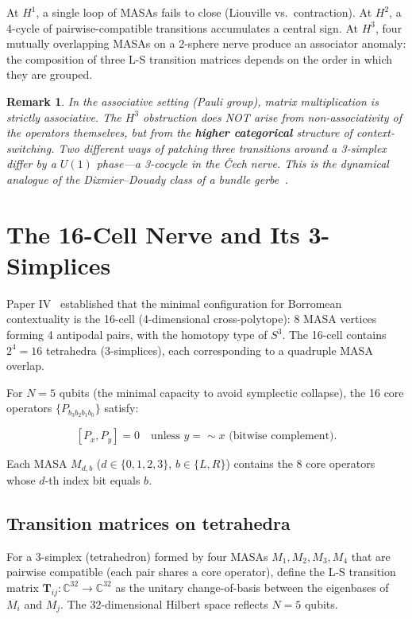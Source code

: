 \documentclass[11pt]{article}
\newtheorem{remark}[theorem]{Remark}
\begin{document}
At $H^1$, a single loop of MASAs fails to close (Liouville vs.\ contraction).
At $H^2$, a 4-cycle of pairwise-compatible transitions accumulates a central
sign. At $H^3$, four mutually overlapping MASAs on a $2$-sphere nerve produce
an associator anomaly: the composition of three L-S transition matrices
depends on the order in which they are grouped.

\begin{remark}
In the associative setting (Pauli group), matrix multiplication is strictly
associative. The $H^3$ obstruction does NOT arise from non-associativity of
the operators themselves, but from the \textbf{higher categorical} structure
of context-switching. Two different ways of patching three transitions
around a 3-simplex differ by a $U(1)$ phase---a 3-cocycle in the
\v{C}ech nerve. This is the dynamical analogue of the Dixmier--Douady
class of a bundle gerbe~\cite{Murray96,Brylinski93}.
\end{remark}

\section{The 16-Cell Nerve and Its 3-Simplices}
\label{sec:16cell}

Paper IV~\cite{PaperIV} established that the minimal configuration for
Borromean contextuality is the 16-cell (4-dimensional cross-polytope):
8 MASA vertices forming 4 antipodal pairs, with the homotopy type of
$S^3$. The 16-cell contains $2^4 = 16$ tetrahedra (3-simplices),
each corresponding to a quadruple MASA overlap.

For $N=5$ qubits (the minimal capacity to avoid symplectic collapse),
the 16 core operators $\{P_{b_3b_2b_1b_0}\}$ satisfy:

\[
[P_x, P_y] = 0 \quad \text{unless } y = \sim x \text{ (bitwise complement)}.
\]

Each MASA $M_{d,b}$ ($d \in \{0,1,2,3\}$, $b \in \{L,R\}$) contains the
8 core operators whose $d$-th index bit equals $b$.

\subsection{Transition matrices on tetrahedra}
\label{sec:transitions}

For a 3-simplex (tetrahedron) formed by four MASAs
$M_1, M_2, M_3, M_4$ that are pairwise compatible (each pair shares a
core operator), define the L-S transition matrix
$\mathbf{T}_{ij}: \mathbb{C}^{32} \to \mathbb{C}^{32}$ as the unitary
change-of-basis between the eigenbases of $M_i$ and $M_j$. The
$32$-dimensional Hilbert space reflects $N=5$ qubits.
\end{document}
